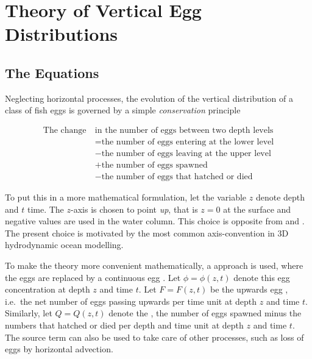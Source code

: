 %
%

\chapter{Theory of Vertical Egg Distributions}

\section{The Equations}\label{sec:equations}


Neglecting horizontal processes, the evolution of the vertical
distribution
of a class of fish eggs is governed by a simple \emph{conservation}
principle

\begin{equation}\label{eq:consprin}
\begin{split}
  \text{The change}\ & \text{in the number of eggs between two depth levels} \\
  & = \text{the number of eggs entering at the lower level} \\
  & - \text{the number of eggs leaving at the upper level} \\
  & + \text{the number of eggs spawned} \\
  & - \text{the number of eggs that hatched or died}
\end{split}
\end{equation}

To put this in a more mathematical formulation, let the variable
$z$ denote depth and $t$ time. The $z$-axis is chosen to point
\emph{up}, that is $z = 0$ at the surface and negative values are
used in the water column. This choice is opposite from
\cite{sund83,sund91} and \cite{west89}. The present choice is
motivated by the most
common axis-convention in 3D hydrodynamic ocean modelling.

To make the theory more convenient mathematically, a
 approach is used, where the eggs are
replaced by a continuous egg .  Let $\phi =
\phi(z,t)$ denote this egg concentration at depth $z$ and time
$t$. Let $F = F(z,t)$ be the upwards egg , i.e.\ the net
number of eggs passing upwards per time unit at depth $z$ and time
$t$. Similarly, let $Q = Q(z,t)$ denote the , the
number of eggs spawned minus the numbers that hatched or died per
depth and time unit at depth $z$ and time $t$.  The source term can
also be used to take care of other processes, such as loss of eggs by
horizontal advection.


